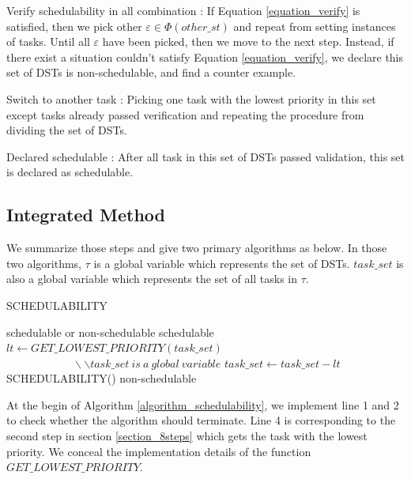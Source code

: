 \documentclass[sigconf]{acmart}
\begin{document}
\begin{compactdesc}
  \item[Verify schedulability in all combination]: If Equation \ref{equation_verify} is satisfied, then we pick other $\varepsilon\in\Phi(other\_st)$ and repeat from setting instances of tasks. Until all $\varepsilon$ have been picked, then we move to the next step. Instead, if there exist a situation couldn't satisfy Equation \ref{equation_verify}, we declare this set of DSTs is non-schedulable, and find a counter example.
  \item[Switch to another task]: Picking one task with the lowest priority in this set except tasks already passed verification and repeating the procedure from dividing the set of DSTs.
  \item[Declared schedulable]: After all task in this set of DSTs passed validation, this set is declared as schedulable. 
\end{compactdesc}

\subsection{Integrated Method}
We summarize those steps and give two primary algorithms as below. In those two algorithms, $\tau$ is a global variable which represents the set of DSTs. $task\_set$ is also a global variable which represents the set of all tasks in $\tau$.

\begin{algorithm}
  \caption{SCHEDULABILITY}
  \label{algorithm_schedulability}
  \begin{algorithmic}[1]
    \REQUIRE 
    \ENSURE schedulable or non-schedulable 
    \STATE \Return schedulable
    \ELSE \STATE $lt \leftarrow GET\_LOWEST\_PRIORITY(task\_set)$\\$\qquad\qquad\qquad\backslash\backslash task\_set\ is\ a\ global\ variable$
    \STATE $task\_set\leftarrow task\_set-lt$
    \STATE \Return SCHEDULABILITY()
    \ELSE
    \STATE \Return non-schedulable 
    \ENDIF
    \ENDIF
  \end{algorithmic}
\end{algorithm}

At the begin of Algorithm \ref{algorithm_schedulability}, we implement line 1 and 2 to check whether the algorithm should terminate. Line 4 is corresponding to the second step in section \ref{section_8steps} which gets the task with the lowest priority. We conceal the implementation details of the function $GET\_LOWEST\_PRIORITY$. 
\end{document}

